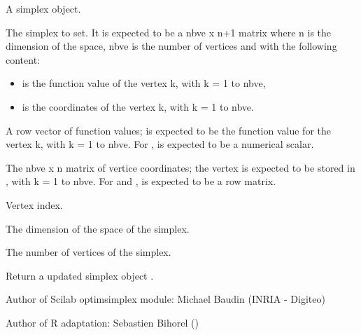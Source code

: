 %
\begin{Arguments}
\begin{ldescription}
\item[\code{this}] A simplex object.
\item[\code{simplex}] The simplex to set. It is expected to be a nbve x n+1 matrix
where n is the dimension of the space, nbve is the number of vertices and
with the following content: \begin{itemize}

\item {} is the function value of the vertex k, with k =
1 to nbve,
\item {} is the coordinates of the vertex k, with
k = 1 to nbve.

\end{itemize}


\item[\code{fv}] A row vector of function values;  is expected to be the
function value for the vertex k, with k = 1 to nbve. For
,  is expected to be a numerical scalar.
\item[\code{x}] The nbve x n matrix of vertice coordinates; the vertex is expected to
be stored in , with k = 1 to nbve. For
 and ,  is expected
to be a row matrix.
\item[\code{ive}] Vertex index.
\item[\code{n}] The dimension of the space of the simplex.
\item[\code{nbve}] The number of vertices of the simplex.
\end{ldescription}
\end{Arguments}
%
\begin{Value}
Return a updated simplex object .
\end{Value}
%
\begin{Author}\relax
Author of Scilab optimsimplex module: Michael Baudin (INRIA - Digiteo)

Author of R adaptation: Sebastien Bihorel ()
\end{Author}
%
\begin{SeeAlso}\relax
{}
\end{SeeAlso}
